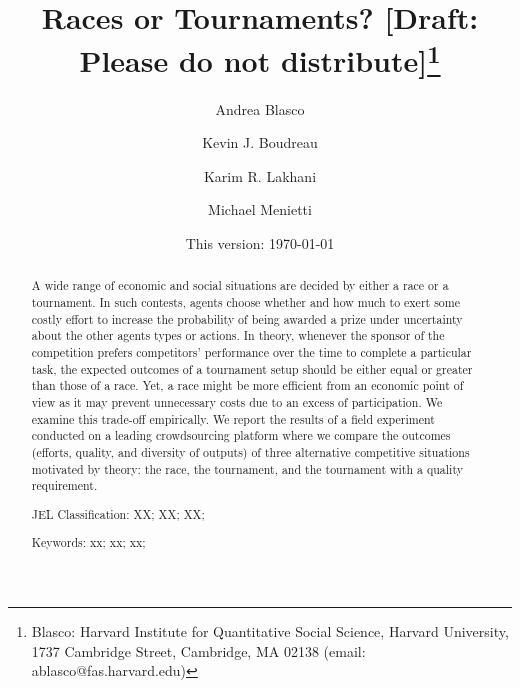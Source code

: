 \documentclass[12pt, titlepage, draft]{article} %
\title{%
Races or Tournaments? [Draft: Please do not distribute]\thanks{Blasco: Harvard Institute for Quantitative Social Science, Harvard University, 1737 Cambridge Street, Cambridge, MA 02138 (email: ablasco@fas.harvard.edu)}
}
\author{%
Andrea Blasco \and Kevin J. Boudreau \and Karim R. Lakhani \and Michael Menietti
}
\date{%
This version: \today
}
\begin{document}
\maketitle
\tableofcontents

\begin{abstract}

\noindent A wide range of economic and social situations are decided by either a
race or a tournament. In such contests, agents choose whether and how
much to exert some costly effort to increase the probability of being
awarded a prize under uncertainty about the other agents types or
actions. In theory, whenever the sponsor of the competition prefers
competitors' performance over the time to complete a particular task,
the expected outcomes of a tournament setup should be either equal or
greater than those of a race. Yet, a race might be more efficient from
an economic point of view as it may prevent unnecessary costs due to an
excess of participation. We examine this trade-off empirically. We
report the results of a field experiment conducted on a leading
crowdsourcing platform where we compare the outcomes (efforts, quality,
and diversity of outputs) of three alternative competitive situations
motivated by theory: the race, the tournament, and the tournament with a
quality requirement.

\smallskip\noindent 
JEL Classification: XX; XX; XX;

\smallskip\noindent 
Keywords: xx; xx; xx;
\end{abstract}


\clearpage




  
\newpage
\singlespacing

\end{document}
